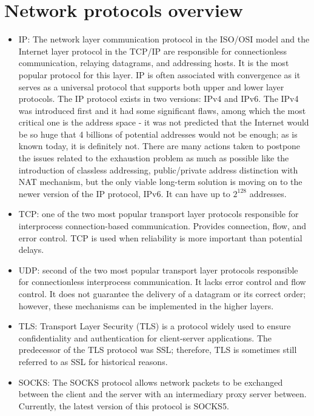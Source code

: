 \section{Network protocols overview}
\begin{itemize}
    \item IP: The network layer communication protocol in the ISO/OSI model and the Internet layer protocol in the TCP/IP are responsible for connectionless communication, relaying datagrams, and addressing hosts. It is the most popular protocol for this layer. IP is often associated with convergence as it serves as a universal protocol that supports both upper and lower layer protocols. The IP protocol exists in two versions: IPv4 and IPv6. The IPv4 was introduced first and it had some significant flaws, among which the most critical one is the address space - it was not predicted that the Internet would be so huge that 4 billions of potential addresses would not be enough; as is known today, it is definitely not. There are many actions taken to postpone the issues related to the exhaustion problem as much as possible like the introduction of classless addressing, public/private address distinction with NAT mechanism, but the only viable long-term solution is moving on to the newer version of the IP protocol, IPv6. It can have up to $2^{128}$ addresses.
    \item TCP: one of the two most popular transport layer protocols responsible for interprocess connection-based communication. Provides connection, flow, and error control. TCP is used when reliability is more important than potential delays.
    \item UDP: second of the two most popular transport layer protocols responsible for connectionless interprocess communication. It lacks error control and flow control. It does not guarantee the delivery of a datagram or its correct order; however, these mechanisms can be implemented in the higher layers.
    \item TLS: Transport Layer Security (TLS) is a protocol widely used to ensure confidentiality and authentication for client-server applications. The predecessor of the TLS protocol was SSL; therefore, TLS is sometimes still referred to as SSL for historical reasons. 
    \item SOCKS: The SOCKS protocol allows network packets to be exchanged between the client and the server with an intermediary proxy server between. Currently, the latest version of this protocol is SOCKS5.

\end{itemize}
